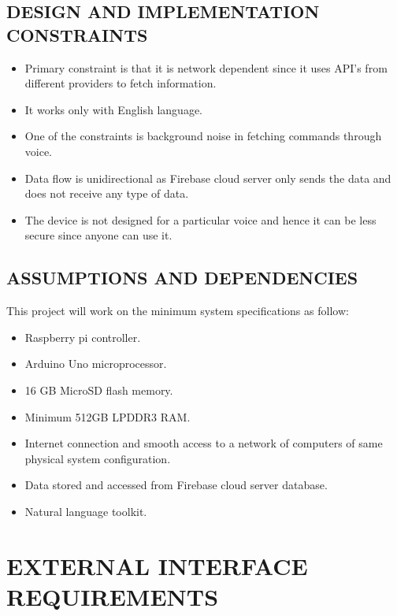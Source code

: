 \documentclass[12pt]{extreport}
\begin{document}
     \subsection{DESIGN AND IMPLEMENTATION CONSTRAINTS}
     \begin{itemize}
     \item Primary constraint is that it is network dependent since it uses API's from different providers to fetch information.
     \item It works only with English language.
     \item One of the constraints is background noise in fetching commands through voice.
     \item Data flow is unidirectional as Firebase cloud server only sends the data and does not receive any type of data.
     \item The device is not designed for a particular voice and hence it can be less secure since anyone can use it.
     \end{itemize}
\newpage
\noindent
     \subsection{ASSUMPTIONS AND DEPENDENCIES}
     This project will work on the minimum system specifications as follow:
\begin{itemize}
\item Raspberry pi controller.
\item Arduino Uno microprocessor.
\item 16 GB MicroSD flash memory.
\item Minimum 512GB LPDDR3 RAM.
\item Internet connection and smooth access to a network of computers of same physical system configuration.
\item Data stored and accessed from Firebase cloud server database.
\item Natural language toolkit.
\end{itemize}

\section{EXTERNAL INTERFACE REQUIREMENTS}
\end{document}
